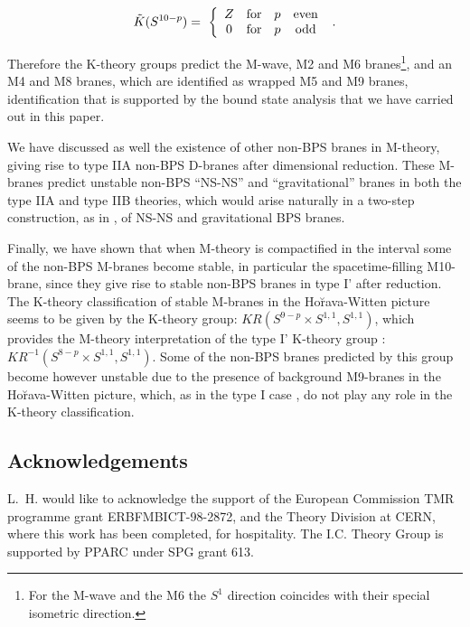 \documentclass[12pt,a4paper]{article}
\begin{document}
\begin{displaymath}
{\tilde K}(S^{10-p}) =
\mbox{ 
$\left\{ \begin{array}{ccccc}
         Z & {\rm for} & p  &  {\rm even}  \\
         0 & {\rm for} & p & {\rm odd}           
                                    \end{array} \right.$\, .}   
\end{displaymath}


\noindent Therefore the K-theory groups predict the M-wave, 
M2 and M6 branes\footnote{For the M-wave and the M6 
the $S^1$ direction coincides with their
special isometric direction.}, and an M4 and M8 branes, which are
identified as wrapped M5 and M9 branes, identification that is
supported by the bound state analysis that we have carried out in
this paper.

We have discussed as well the existence of other non-BPS branes in
M-theory, giving rise to type IIA non-BPS D-branes
after dimensional reduction. These M-branes predict unstable non-BPS
``NS-NS'' and ``gravitational'' branes in both the type IIA and type IIB
theories, which would arise naturally in a two-step construction, as
in \cite{Sen1,Sen3}, of NS-NS and gravitational BPS branes. 

Finally, we have shown that when M-theory is compactified in the
interval some of the non-BPS M-branes become stable, in particular
the spacetime-filling M10-brane, since they give
rise to stable non-BPS branes in type I' after reduction. The
K-theory classification of stable M-branes in the Ho\u{r}ava-Witten
picture seems to be given by the K-theory group:
$KR(S^{9-p}\times S^{1,1}, S^{1,1})$, which provides 
the M-theory interpretation of the type I' K-theory group
\cite{Witten,Horava,BGH}: 
$KR^{-1}(S^{8-p} \times S^{1,1},S^{1,1})$.
Some of the non-BPS branes predicted by this group become however
unstable due to the presence of background M9-branes in the 
Ho\u{r}ava-Witten picture, which, as in the type I case \cite{FGLS}, 
do not play any role in the K-theory classification.

 
\subsection*{Acknowledgements}

L.~H. would like to acknowledge the support of the European Commission 
TMR programme grant ERBFMBICT-98-2872, and the Theory Division at CERN,
where this work has been completed, for hospitality. The I.C. Theory
Group is supported by PPARC under SPG grant 613.
\end{document}
